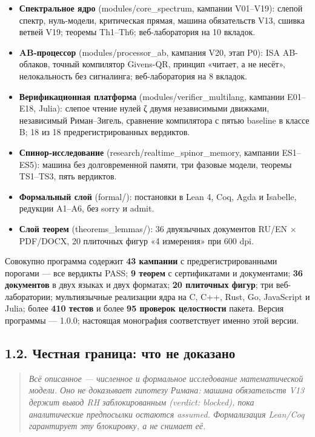 \documentclass[11pt,a4paper]{article}
\begin{document}
\begin{itemize}
  \item \textbf{Спектральное ядро} (modules/core\_spectrum, кампании V01–V19): слепой спектр, нуль-модели, критическая прямая, машина обязательств V13, сшивка ветвей V19; теоремы Th1–Th6; веб-лаборатория на 10 вкладок.
  \item \textbf{AB-процессор} (modules/processor\_ab, кампания V20, этап P0): ISA AB-облаков, точный компилятор Givens-QR, принцип «читает, а не несёт», нелокальность без сигналинга; веб-лаборатория на 8 вкладок.
  \item \textbf{Верификационная платформа} (modules/verifier\_multilang, кампании E01–E18, Julia): слепое чтение нулей ζ двумя независимыми движками, независимый Риман–Зигель, сравнение компилятора с пятью baseline в классе B; 18 из 18 предрегистрированных вердиктов.
  \item \textbf{Спинор-исследование} (research/realtime\_spinor\_memory, кампании ES1–ES5): машина без долговременной памяти, три фазовые модели, теоремы TS1–TS3, пять вердиктов.
  \item \textbf{Формальный слой} (formal/): постановки в Lean 4, Coq, Agda и Isabelle, редукции A1–A6, без sorry и admit.
  \item \textbf{Слой теорем} (theorems\_lemmas/): 36 двуязычных документов RU/EN × PDF/DOCX, 20 плиточных фигур «4 измерения» при 600 dpi.
\end{itemize}

Совокупно программа содержит \textbf{43 кампании} с предрегистрированными порогами — все вердикты PASS; \textbf{9 теорем} с сертификатами и документами; \textbf{36 документов} в двух языках и двух форматах; \textbf{20 плиточных фигур}; три веб-лаборатории; мультиязычные реализации ядра на C, C++, Rust, Go, JavaScript и Julia; более \textbf{410 тестов} и более \textbf{95 проверок целостности} пакета. Версия программы — 1.0.0; настоящая монография соответствует именно этой версии.

\subsection{1.2. Честная граница: что не доказано}

\begin{quote}\itshape Всё описанное — численное и формальное исследование математической модели. Оно не доказывает гипотезу Римана: машина обязательств V13 держит вывод RH заблокированным (verdict: blocked), пока аналитические предпосылки остаются assumed. Формализация Lean/Coq гарантирует эту блокировку, а не снимает её.\end{quote}
\end{document}
